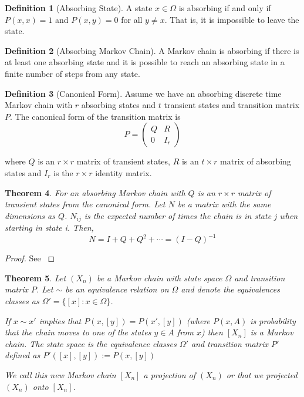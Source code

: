 \documentclass{article}
\theoremstyle{plain}
\newtheorem{theorem}{Theorem}[section]
\theoremstyle{definition}
\newtheorem{defn}[theorem]{Definition}
\theoremstyle{remark}
\numberwithin{equation}{section}
\begin{document}
\begin{defn}[Absorbing State] \cite{grinstead2003}
A state $x \in \Omega$ is absorbing if and only if $P(x,x) = 1$ and $P(x,y) = 0$ for all $y \not = x$.
That is, it is impossible to leave the state.
\end{defn}

\begin{defn}[Absorbing Markov Chain] \cite{grinstead2003}
A Markov chain is absorbing if there is at least one absorbing state and it is possible to reach an absorbing state in a finite number of steps from any state.
\end{defn}

\begin{defn}[Canonical Form] \cite{grinstead2003}
Assume we have an absorbing discrete time Markov chain with $r$ absorbing states and $t$ transient states and  transition matrix $P$.
The canonical form of the transition matrix is
\begin{equation}
    P = \begin{pmatrix}
        Q & R\\
        0 & I_{r}
    \end{pmatrix}
\end{equation}

where $Q$ is an $r \times r$ matrix of transient states, $R$ is an $t \times r$ matrix of absorbing states and $I_{r}$ is the $r \times r$ identity matrix.
\end{defn}

\begin{theorem} \label{thm:fund_exp} \cite{grinstead2003}
For an absorbing Markov chain with $Q$ is an $r \times r$ matrix of transient states from the canonical form. Let $N$ be a matrix with the same dimensions as $Q$. $N_{ij}$ is the expected number of times the chain is in state j when starting in state i. Then,
\begin{equation}
    N = I + Q + Q^2 + \cdots = (I - Q)^{-1}
\end{equation}
\end{theorem}

\begin{proof}
See \cite{grinstead2003}
\end{proof}

\begin{theorem}\label{thm:mc_projection} \cite{LevinPeresWilmer2006}
Let $(X_n)$ be a Markov chain with state space $\Omega$ and transition matrix $P$.
Let $\sim$ be an equivalence relation on $\Omega$ and denote the equivalences classes as $\Omega' = \{[x]: x \in \Omega\}$.

If $x \sim x'$ implies that $P(x,[y]) = P(x', [y])$ (where $P(x,A)$ is probability that the chain moves to one of the states $y \in A$ from $x$) then $[X_n]$  is a Markov chain.
The state space is the equivalence classes $\Omega'$ and transition matrix $P'$ defined as $P'([x],[y]) := P(x, [y])$

We call this new Markov chain $[X_n]$ a projection of $(X_n)$ or that we projected $(X_n)$ onto $[X_n]$.
\end{theorem}
\end{document}
